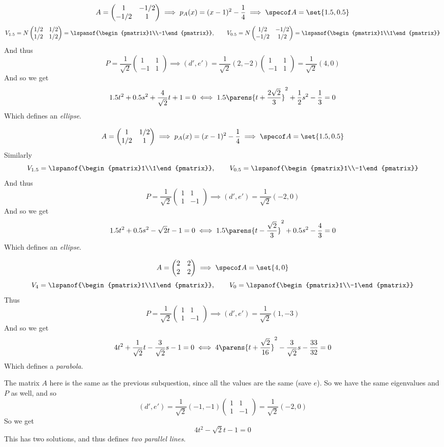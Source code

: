 \documentclass[10pt]{article}
\def\pmat#1{\begin{pmatrix} #1 \end{pmatrix}}
\def\pmat#1{\begin{pmatrix}#1\end{pmatrix}}
\begin{document}
        \item
            \[ A = \pmat{1&-1/2 \\ -1/2&1} \implies p_A(x) = (x-1)^2-\frac14 \implies \specof A = \set{1.5,0.5} \]
            \[ V_{1.5} = N\pmat{1/2 & 1/2 \\ 1/2 & 1/2} = \lspanof{\pmat{1\\-1}},\qquad V_{0.5} = N\pmat{1/2 & -1/2 \\ -1/2 & 1/2} = \lspanof{\pmat{1\\1}} \]
            And thus
            \[ P = \frac1{\sqrt2}\pmat{1&1\\-1&1} \implies (d',e') = \frac1{\sqrt2}(2,-2)\pmat{1&1\\-1&1} = \frac1{\sqrt2}(4,0) \]
            And so we get
            \[ 1.5t^2 + 0.5s^2 + \frac4{\sqrt2}t + 1 = 0 \iff 1.5\parens{t+\frac{2\sqrt2}3}^2 + \frac12s^2 - \frac13 = 0 \]
            Which defines an \emph{ellipse}.

        \item
            \[ A = \pmat{1&1/2\\1/2&1} \implies p_A(x) = (x-1)^2 - \frac14 \implies \specof A = \set{1.5,0.5} \]
            Similarly
            \[ V_{1.5} = \lspanof{\pmat{1\\1}},\qquad V_{0.5} = \lspanof{\pmat{1\\-1}} \]
            And thus
            \[ P = \frac1{\sqrt2}\pmat{1&1\\1&-1} \implies (d',e') = \frac1{\sqrt2}(-2,0) \]
            And so we get
            \[ 1.5t^2 + 0.5s^2 - \sqrt2t - 1 = 0 \iff 1.5\parens{t-\frac{\sqrt2}3}^2 + 0.5s^2 - \frac43 = 0 \]
            Which defines an \emph{ellipse}.

        \item
            \[ A = \pmat{2 & 2 \\ 2 & 2} \implies \specof A = \set{4,0} \]
            \[ V_4 = \lspanof{\pmat{1\\1}},\qquad V_0 = \lspanof{\pmat{1\\-1}} \]
            Thus
            \[ P = \frac1{\sqrt2}\pmat{1&1\\1&-1} \implies (d',e') = \frac1{\sqrt2}(1,-3) \]
            And so we get
            \[ 4t^2 + \frac1{\sqrt2}t - \frac3{\sqrt2}s - 1 = 0 \iff 4\parens{t+\frac{\sqrt2}{16}}^2 - \frac3{\sqrt2}s - \frac{33}{32} = 0 \]
            Which defines a \emph{parabola}.

        \item The matrix $A$ here is the same as the previous subquestion, since all the values are the same (save $e$).
            So we have the same eigenvalues and $P$ as well, and so
            \[ (d',e') = \frac1{\sqrt2}(-1,-1)\pmat{1&1\\1&-1} = \frac1{\sqrt2}(-2,0) \]
            So we get
            \[ 4t^2 - \sqrt2t - 1 = 0 \]
            This has two solutions, and thus defines \emph{two parallel lines}.
    \eenum
\end{document}
